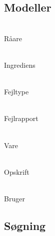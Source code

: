 \subsection{Modeller}

\item[FoodType] \hfill \\
Råare

\item[Ingredient] \hfill \\
Ingrediens

\item[IssueCategory] \hfill \\
Fejltype

\item[Issue] \hfill \\
Fejlrapport

\item[ListItem] \hfill \\
Vare

\item[Recipe] \hfill \\
Opskrift

\item[User] \hfill \\
Bruger

\begin{description}

\end{description}

\subsection{Søgning}
\label{sec:soegning}



